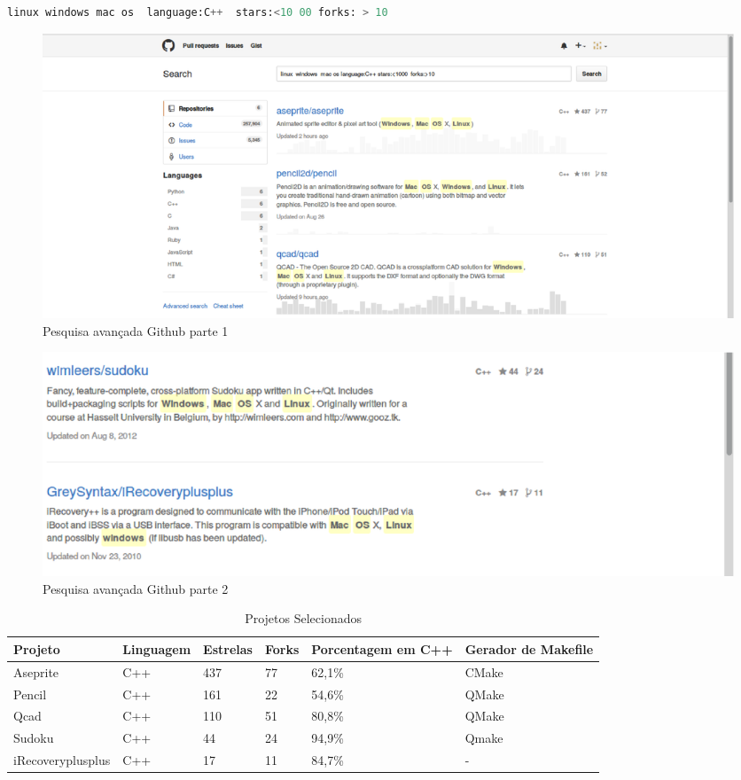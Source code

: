 \begin{lstlisting}[language=python, caption={Busca avançada github },
                  label=busca_avanacada_github]
     linux windows mac os  language:C++  stars:<10 00 forks: > 10
\end{lstlisting}


\begin{figure}[h]
    \centering
        \includegraphics[scale=0.40]{figuras/github_search_1.eps}
    \caption{Pesquisa avançada Github parte 1}
    \label{pesquisa_github}
\end{figure}
\begin{figure}[h]
    \centering
        \includegraphics[scale=0.40]{figuras/github_search_2.eps}
    \caption{Pesquisa avançada Github parte 2}
    \label{pesquisa_github}
\end{figure}

\begin{table}[h]
\centering
\tiny
\caption{Projetos Selecionados}
\label{projetos_selecionados}
\begin{tabular}{llllll}
\textbf{Projeto} & \textbf{Linguagem} & \textbf{Estrelas} & \textbf{Forks} & \textbf{Porcentagem em C++} & \textbf{Gerador de Makefile}\\ \toprule
Aseprite & C++ & 437  & 77  & 62,1\% & CMake \\ \midrule 
Pencil & C++ &  161 & 22  & 54,6\%   & QMake \\ \midrule
Qcad & C++ & 110 & 51 & 80,8\%       & QMake \\ \midrule 
Sudoku & C++ &  44  & 24 & 94,9\%    & Qmake \\ \midrule
iRecoveryplusplus & C++ & 17 & 11 & 84,7\% & -  \\ \bottomrule
\end{tabular} 
\end{table}



